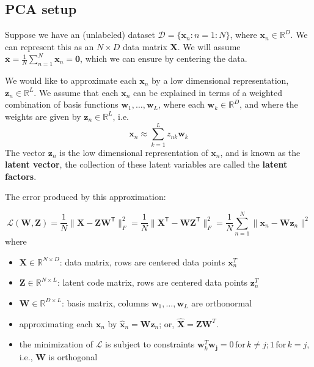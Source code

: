 \documentclass[11pt]{article}
\begin{document}
\subsection{PCA setup}
Suppose we have an (unlabeled) dataset $\mathcal{D} = \{\boldsymbol{x}_n : n = 1:N\}$, where $\boldsymbol{x}_n \in \mathbb{R}^D$. We can represent this as an $N \times D$ data matrix $\mathbf{X}$. We will assume $\overline{\boldsymbol{x}} = \frac{1}{N}\sum_{n=1}^N \boldsymbol{x}_n = \mathbf{0}$, which we can ensure by centering the data.

We would like to approximate each $\boldsymbol{x}_n$ by a low dimensional representation, $\boldsymbol{z}_n \in \mathbb{R}^L$. We assume that each $\boldsymbol{x}_n$ can be explained in terms of a weighted combination of basis functions $\boldsymbol{w}_1, \dots, \boldsymbol{w}_L$, where each $\boldsymbol{w}_k \in \mathbb{R}^D$, and where the weights are given by $\boldsymbol{z}_n \in \mathbb{R}^L$, i.e.
\[
\boldsymbol{x}_n \approx \sum_{k=1}^L z_{nk} \boldsymbol{w}_k
\]
The vector $\boldsymbol{z}_n$ is the low dimensional representation of $\boldsymbol{x}_n$, and is known as the \textbf{latent vector}, the collection of these latent variables are called the \textbf{latent factors}.

The error produced by this approximation:

\[
\mathcal{L}(\mathbf{W}, \mathbf{Z}) = \frac{1}{N} \|\mathbf{X} - \mathbf{Z}\mathbf{W}^\mathsf{T}\|_F^2 = \frac{1}{N} \|\mathbf{X}^\mathsf{T} - \mathbf{W}\mathbf{Z}^\mathsf{T}\|_F^2 = \frac{1}{N} \sum_{n=1}^N \|\boldsymbol{x}_n - \mathbf{W}\boldsymbol{z}_n\|^2
\]
where
\begin{itemize}
    \item $\mathbf{X} \in \mathbb{R}^{N \times D}$: data matrix, rows are centered data points $\mathbf{x}_n^T$
    \item $\mathbf{Z} \in \mathbb{R}^{N \times L}$: latent code matrix, rows are centered data points $\mathbf{z}_n^T$
    \item $\mathbf{W} \in \mathbb{R}^{D \times L}$: basis matrix, columns $\boldsymbol{w}_1, \dots, \boldsymbol{w}_L$ are orthonormal
    \item approximating each $\boldsymbol{x}_n$ by $\hat{\boldsymbol{x}}_n = \mathbf{W}\boldsymbol{z}_n$; or, $\hat{\mathbf{X}
    } = \mathbf{Z} \mathbf{W}^T$.
    \item the minimization of $\mathcal{L}$ is subject to constraints $\mathbf{w}_k^T \mathbf{w_j} = 0 \, \text{for}\, k \neq j \text{;}\, 1 \, \text{for}\, k = j$, i.e., $\mathbf{W}$ is orthogonal
\end{itemize}
\end{document}
